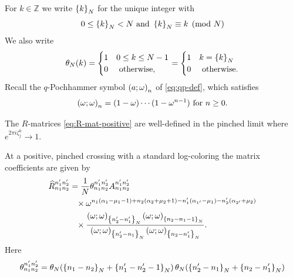 \documentclass{sl2ams}
\numberwithin{equation}{section}
\newcommand{\ZZ}{\mathbb{Z}}
\begin{document}
For \(k \in \ZZ\) we write \(\left\{k\right\}_{N}\) for the unique integer with
\[
  0 \le \left\{k\right\}_{N} < N
  \text{ and }
  \left\{k\right\}_{N} \equiv k \pmod {N}
\]
We also write
\[
  \theta_{N}\mathopen{}\left(k\right)
  =
  \begin{cases}
    1 & 0 \le k \le N -1
    \\
    0 & \text{ otherwise,}
  \end{cases}
  =
  \begin{cases}
    1 & k = \left\{k\right\}_{N}
    \\
    0 & \text{ otherwise.}
  \end{cases}
\]
Recall the \(q\)-Pochhammer symbol \(\qp{a}{n}\) of \eqref{eq:qp-def}, which satisfies
\[
  \qp{\omega}{n} = (1 - \omega) \cdots (1 - \omega^{n -1}) \text{ for } n \ge 0.
\]

\begin{theorem}
  \label{thm:R-mat-pinched}
  \begin{thmenum}
    \item
    \label{thm:R-mat-pinched:regular}
     The \(R\)-matrices \eqref{eq:R-mat-positive} are well-defined in the pinched limit where \(e^{2\pi i \zeta_j^0} \to 1\).
    \item
    \label{thm:R-mat-pinched:formula}
      At a positive, pinched crossing with a standard log-coloring the matrix coefficients are given by
      \begin{equation}
        \label{eq:R-mat-pinched:formula}
        \begin{aligned}
          \rmat{n_1}{n_2}{n_1'}{n_2'} 
          &=
          \frac{1}{\nr}
          \theta_{n_1 n_2}^{n_1' n_2'}
          A_{n_1 n_2}^{n_1' n_2'}
          \\
          &\phantom{=}\times
          \omega^{
            n_1(\alpha_1-\mu_1 - 1)
            +
            n_2(\alpha_2 + \mu_2 + 1)
            -
            n_1' (\alpha_{1'} - \mu_{1})
            -
            n_2' (\alpha_{2'} + \mu_2)
          }
          \\
          &\phantom{=}\times
          \frac{
            \qp{\omega}{\modb{n_2' - n_1'}}
            \qp{\omega}{\modb{n_2 - n_1 - 1}}
            }{
            \qp{\omega}{\modb{n_2' - n_1}}
            \qp{\omega}{\modb{n_2 - n_1'}}
          }.
        \end{aligned}
      \end{equation}
    Here
    \[
      \theta_{n_1 n_2}^{n_1' n_2'}
      =
      \theta_{N}\mathopen{}\left(
        \left\{n_1 - n_2\right\}_{N} + \left\{n_1' - n_2' -1\right\}_{N}
      \right)
      \theta_{N}\mathopen{}\left(
        \left\{n_2' - n_1\right\}_{N} + \left\{n_2 - n_1'\right\}_{N}
\right)\]
\end{thmenum}
\end{theorem}
\end{document}
